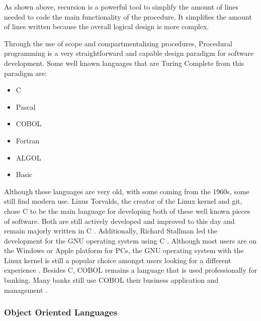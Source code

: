 As shown above, recursion is a powerful tool to simplify the amount of lines needed to code the main functionality of the procedure.
It simplifies the amount of lines written because the overall logical design is more complex.

Through the use of scope and compartmentalizing procedures, Procedural programming is a very straightforward and capable design paradigm for software development.
Some well known languages that are Turing Complete from this paradigm are: 
\begin{itemize}
    \item C
    \item Pascal
    \item COBOL
    \item Fortran
    \item ALGOL
    \item Basic        
\end{itemize}

Although these languages are very old, with some coming from the 1960s, some still find modern use.
Linus Torvalds, the creator of the Linux kernel and git, chose C to be the main language for developing both of these well known pieces of software.
Both are still actively developed and improved to this day and remain majorly written in C \cite{GitMadeinC,LinuxMadeinC}.
Additionally, Richard Stallman led the development for the GNU operating system using C \cite{GNUPreferC}.
Although most users are on the Windows or Apple platform for PCs, the GNU operating system with the Linux kernel is still a popular choice amongst users looking for a different experience \cite{MarketShareOS}.
Besides C, COBOL remains a language that is used professionally for banking.
Many banks still use COBOL their business application and management \cite{COBOLBanks}.

\subsubsection{Object Oriented Languages}\label{subsubsec:OOPL}

